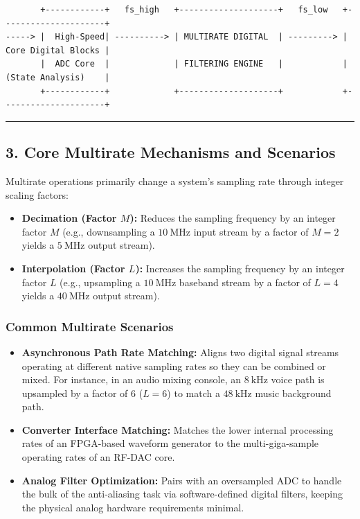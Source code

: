 \documentclass[
]{article}
\providecommand{\tightlist}{%
  \setlength{\itemsep}{0pt}\setlength{\parskip}{0pt}}
\begin{document}
\begin{verbatim}
       +------------+   fs_high   +--------------------+   fs_low   +---------------------+
-----> |  High-Speed| ----------> | MULTIRATE DIGITAL  | ---------> | Core Digital Blocks |
       |  ADC Core  |             | FILTERING ENGINE   |            | (State Analysis)    |
       +------------+             +--------------------+            +---------------------+
\end{verbatim}

\begin{center}\rule{0.5\linewidth}{0.5pt}\end{center}

\subsection{3. Core Multirate Mechanisms and
Scenarios}\label{core-multirate-mechanisms-and-scenarios}

Multirate operations primarily change a system's sampling rate through
integer scaling factors:

\begin{itemize}
\tightlist
\item
  \textbf{Decimation (Factor \(M\)):} Reduces the sampling frequency by
  an integer factor \(M\) (e.g., downsampling a \(10\ \text{MHz}\) input
  stream by a factor of \(M=2\) yields a \(5\ \text{MHz}\) output
  stream).
\item
  \textbf{Interpolation (Factor \(L\)):} Increases the sampling
  frequency by an integer factor \(L\) (e.g., upsampling a
  \(10\ \text{MHz}\) baseband stream by a factor of \(L=4\) yields a
  \(40\ \text{MHz}\) output stream).
\end{itemize}

\subsubsection{Common Multirate
Scenarios}\label{common-multirate-scenarios}

\begin{itemize}
\tightlist
\item
  \textbf{Asynchronous Path Rate Matching:} Aligns two digital signal
  streams operating at different native sampling rates so they can be
  combined or mixed. For instance, in an audio mixing console, an
  \(8\ \text{kHz}\) voice path is upsampled by a factor of 6 (\(L=6\))
  to match a \(48\ \text{kHz}\) music background path.
\item
  \textbf{Converter Interface Matching:} Matches the lower internal
  processing rates of an FPGA-based waveform generator to the
  multi-giga-sample operating rates of an RF-DAC core.
\item
  \textbf{Analog Filter Optimization:} Pairs with an oversampled ADC to
  handle the bulk of the anti-aliasing task via software-defined digital
  filters, keeping the physical analog hardware requirements minimal.
\end{itemize}
\end{document}
